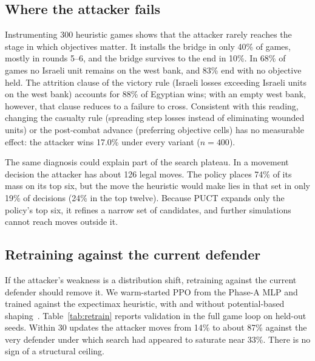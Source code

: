 \documentclass{article}
\begin{document}
\subsection{Where the attacker fails}
\label{sec:failure}
Instrumenting 300 heuristic games shows that the attacker rarely reaches the stage in
which objectives matter. It installs the bridge in only 40\% of games, mostly in rounds
5--6, and the bridge survives to the end in 10\%. In 68\% of games no Israeli unit
remains on the west bank, and 83\% end with no objective held. The attrition clause of
the victory rule (Israeli losses exceeding Israeli units on the west bank) accounts for
88\% of Egyptian wins; with an empty west bank, however, that clause reduces to a failure
to cross. Consistent with this reading, changing the casualty rule (spreading step losses
instead of eliminating wounded units) or the post-combat advance (preferring objective
cells) has no measurable effect: the attacker wins 17.0\% under every variant ($n=400$).

The same diagnosis could explain part of the search plateau. In a movement decision the
attacker has about 126 legal moves. The policy places 74\% of its mass on its top six,
but the move the heuristic would make lies in that set in only 19\% of decisions (24\% in
the top twelve). Because PUCT expands only the policy's top six, it refines a narrow set of
candidates, and further simulations cannot reach moves outside it.

\subsection{Retraining against the current defender}
\label{sec:retrain}
If the attacker's weakness is a distribution shift, retraining against the current
defender should remove it. We warm-started PPO from the Phase-A MLP and trained against
the expectimax heuristic, with and without potential-based shaping~\cite{ng}.
Table~\ref{tab:retrain} reports validation in the full game loop on held-out seeds. Within
30 updates the attacker moves from 14\% to about 87\% against the very defender under
which search had appeared to saturate near 33\%. There is no sign of a structural ceiling.
\end{document}

